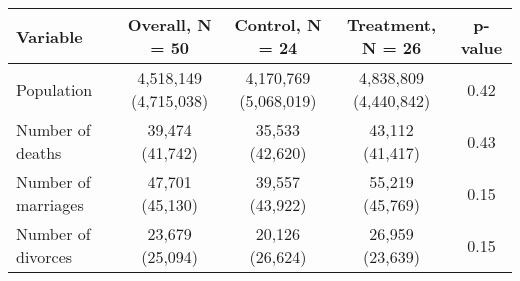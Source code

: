 
\begin{tabular}{lcccc}
\toprule
Variable & Overall, N = 50 & Control, N = 24 & Treatment, N = 26 & p-value\\
\midrule
Population & 4,518,149 (4,715,038) & 4,170,769 (5,068,019) & 4,838,809 (4,440,842) & 0.42\\
Number of deaths & 39,474 (41,742) & 35,533 (42,620) & 43,112 (41,417) & 0.43\\
Number of marriages & 47,701 (45,130) & 39,557 (43,922) & 55,219 (45,769) & 0.15\\
Number of divorces & 23,679 (25,094) & 20,126 (26,624) & 26,959 (23,639) & 0.15\\
\bottomrule
\end{tabular}